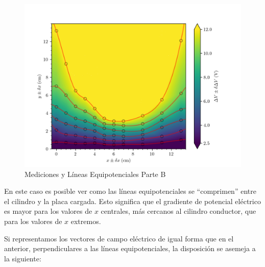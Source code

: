 \documentclass{article}
\begin{document}
\begin{figure}[H]
  \hspace{-0.1cm}\includegraphics[scale=0.8]{plot2.png}
  \caption{Mediciones y Líneas Equipotenciales Parte B}
\end{figure}

En este caso es posible ver como las líneas equipotenciales se ``comprimen'' entre el cilindro y la placa cargada. Esto significa que el gradiente de potencial eléctrico es mayor para los valores de $x$ centrales, más cercanos al cilindro conductor, que para los valores de $x$ extremos.

Si representamos los vectores de campo eléctrico de igual forma que en el anterior, perpendiculares a las líneas equipotenciales, la disposición se asemeja a la siguiente:

\phantom{x}
\end{document}

